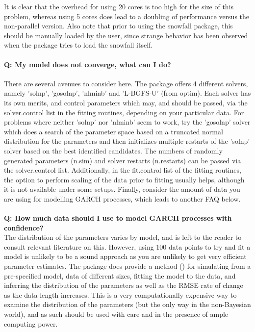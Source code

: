 It is clear that the overhead for using 20 cores is too high for the size of
this problem, whereas using 5 cores does lead to a doubling of performance
versus the non-parallel version. Also note that prior to using the snowfall
package, this should be manually loaded by the user, since strange behavior has
been observed when the package tries to load the snowfall itself.\\
\\
\textbf{Q: My model does not converge, what can I do?}\\
\\
There are several avenues to consider here. The package offers 4 different
solvers, namely 'solnp', 'gosolnp', 'nlminb' and 'L-BGFS-U' (from optim).
Each solver has its own merits, and control parameters which may, and should be
passed, via the solver.control list in the fitting routines, depending on your
particular data. For problems where neither 'solnp' nor 'nlminb' seem to work,
try the 'gosolnp' solver which does a search of the parameter space based on a
truncated normal distribution for the parameters and then initializes multiple
restarts of the 'solnp' solver based on the best identified candidates. The
numbers of randomly generated parameters (n.sim) and solver restarts (n.restarts)
can be passed via the solver.control list. Additionally, in the fit.control list
of the fitting routines, the option to perform scaling of the data prior to
fitting usually helps, although it is not available under some setups. Finally,
consider the amount of data you are using for modelling GARCH processes,
which leads to another FAQ below.\\
\\
\textbf{Q: How much data should I use to model GARCH processes with confidence?}\\
The distribution of the parameters varies by model, and is left to the reader to
consult relevant literature on this. However, using 100 data points to try and
fit a model is unlikely to be a sound approach as you are unlikely to get very
efficient parameter estimates. The \verb@rugarch@ package does provide a method
(\verb@ugarchdistribution@) for simulating from a pre-specified model, data of
different sizes, fitting the model to the data, and inferring the distribution
of the parameters as well as the RMSE rate of change as the data length
increases. This is a very computationally expensive way to examine the
distribution of the parameters (but the only way in the non-Bayesian world), and
as such should be used with care and in the presence of ample computing power.\\
